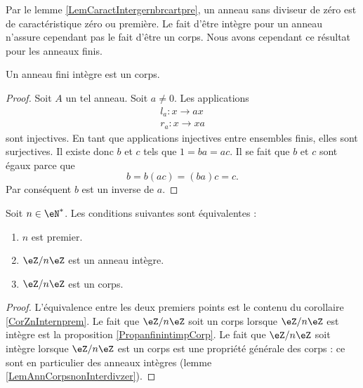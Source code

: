 Par le lemme \ref{LemCaractIntergernbrcartpre}, un anneau sans diviseur de zéro est de caractéristique zéro ou première. Le fait d'être intègre pour un anneau n'assure cependant pas le fait d'être un corps. Nous avons cependant ce résultat pour les anneaux finis.

\begin{proposition}     \label{PropanfinintimpCorp}
    Un anneau fini intègre est un corps.
\end{proposition}

\begin{proof}
    Soit \( A\) un tel anneau. Soit \( a\neq 0\). Les applications 
    \begin{subequations}
        \begin{align}
            l_a\colon x\to ax\\
            r_a\colon x\to xa
        \end{align}
    \end{subequations}
    sont injectives. En tant que applications injectives entre ensembles finis, elles sont surjectives. Il existe donc \( b\) et \( c\) tels que \( 1=ba=ac\). Il se fait que \( b\) et \( c\) sont égaux parce que
    \begin{equation}
        b=b(ac)=(ba)c=c.
    \end{equation}
    Par conséquent \( b\) est un inverse de \( a\).
\end{proof}

\begin{proposition}     \label{PropzhFgNJ}
    Soit \( n\in\eN^*\). Les conditions suivantes sont équivalentes :
    \begin{enumerate}
        \item
            \( n\) est premier.
        \item
            \( \eZ/n\eZ\) est un anneau intègre.
        \item
            \( \eZ/n\eZ\) est un corps.
    \end{enumerate}
\end{proposition}

\begin{proof}
    L'équivalence entre les deux premiers points est le contenu du corollaire \ref{CorZnInternprem}. Le fait que \( \eZ/n\eZ\) soit un corps lorsque \( \eZ/n\eZ\) est intègre est la proposition \ref{PropanfinintimpCorp}. Le fait que \( \eZ/n\eZ\) soit intègre lorsque \( \eZ/n\eZ\) est un corps est une propriété générale des corps : ce sont en particulier des anneaux intègres (lemme \ref{LemAnnCorpsnonInterdivzer}).
\end{proof}

